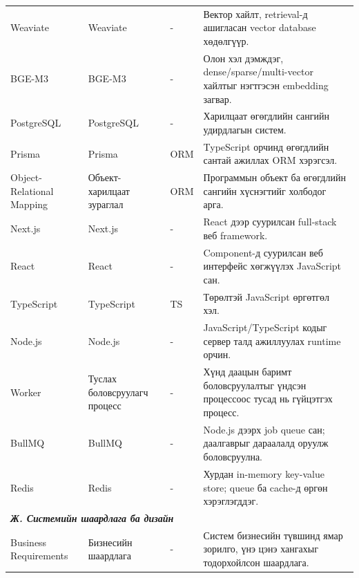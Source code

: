 {\begin{longtable}{p{} p{} p{} p{}}
Weaviate & Weaviate & - & Вектор хайлт, retrieval-д ашигласан vector database хөдөлгүүр. \\

BGE-M3 & BGE-M3 & - & Олон хэл дэмждэг, dense/sparse/multi-vector хайлтыг нэгтгэсэн embedding загвар. \\

PostgreSQL & PostgreSQL & - & Харилцаат өгөгдлийн сангийн удирдлагын систем. \\

Prisma & Prisma & ORM & TypeScript орчинд өгөгдлийн сантай ажиллах ORM хэрэгсэл. \\

Object-Relational Mapping & Объект-харилцаат зураглал & ORM & Программын объект ба өгөгдлийн сангийн хүснэгтийг холбодог арга. \\

Next.js & Next.js & - & React дээр суурилсан full-stack веб framework. \\

React & React & - & Component-д суурилсан веб интерфейс хөгжүүлэх JavaScript сан. \\

TypeScript & TypeScript & TS & Төрөлтэй JavaScript өргөтгөл хэл. \\

Node.js & Node.js & - & JavaScript/TypeScript кодыг сервер талд ажиллуулах runtime орчин. \\

Worker & Туслах боловсруулагч процесс & - & Хүнд даацын баримт боловсруулалтыг үндсэн процессоос тусад нь гүйцэтгэх процесс. \\

BullMQ & BullMQ & - & Node.js дээрх job queue сан; даалгаврыг дараалалд оруулж боловсруулна. \\

Redis & Redis & - & Хурдан in-memory key-value store; queue ба cache-д өргөн хэрэглэгддэг. \\

\midrule
\multicolumn{4}{l}{\textbf{\textit{Ж. Системийн шаардлага ба дизайн}}} \\
\midrule

Business Requirements & Бизнесийн шаардлага & - & Систем бизнесийн түвшинд ямар зорилго, үнэ цэнэ хангахыг тодорхойлсон шаардлага. \\


\end{longtable}}

